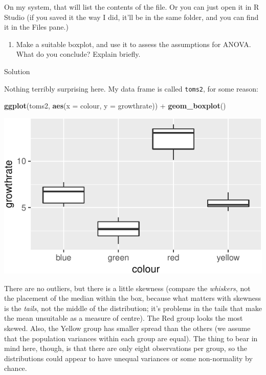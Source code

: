 \documentclass[]{tufte-book}
\newenvironment{Shaded}{}{}
\newcommand{\DataTypeTok}[1]{\textcolor[rgb]{0.56,0.13,0.00}{#1}}
\newcommand{\KeywordTok}[1]{\textcolor[rgb]{0.00,0.44,0.13}{\textbf{#1}}}
\newcommand{\NormalTok}[1]{#1}
\newcommand{\OperatorTok}[1]{\textcolor[rgb]{0.40,0.40,0.40}{#1}}
\newcommand{\StringTok}[1]{\textcolor[rgb]{0.25,0.44,0.63}{#1}}
\providecommand{\tightlist}{%
  \setlength{\itemsep}{0pt}\setlength{\parskip}{0pt}}
\theoremstyle{definition}
\theoremstyle{definition}
\theoremstyle{definition}
\theoremstyle{remark}
\begin{document}
On my system, that will list the contents of the file. Or you can just
open it in R Studio (if you saved it the way I did, it'll be in the same
folder, and you can find it in the Files pane.)

\begin{enumerate}
\def\labelenumi{(\alph{enumi})}
\setcounter{enumi}{3}
\tightlist
\item
  Make a suitable boxplot, and use it to assess the assumptions for
  ANOVA. What do you conclude? Explain briefly.
\end{enumerate}

Solution

Nothing terribly surprising here. My data frame is called
\texttt{toms2}, for some reason:

\begin{Shaded}
\begin{Highlighting}[]
\KeywordTok{ggplot}\NormalTok{(toms2, }\KeywordTok{aes}\NormalTok{(}\DataTypeTok{x =}\NormalTok{ colour, }\DataTypeTok{y =}\NormalTok{ growthrate)) }\OperatorTok{+}\StringTok{ }
\StringTok{    }\KeywordTok{geom_boxplot}\NormalTok{()}
\end{Highlighting}
\end{Shaded}

\includegraphics{11-tidying-and-selecting-data_files/figure-latex/unnamed-chunk-32-1}

There are no outliers, but there is a little skewness (compare the
\emph{whiskers}, not the placement of the median within the box, because
what matters with skewness is the \emph{tails}, not the middle of the
distribution; it's problems in the tails that make the mean unsuitable
as a measure of centre). The Red group looks the most skewed. Also, the
Yellow group has smaller spread than the others (we assume that the
population variances within each group are equal). The thing to bear in
mind here, though, is that there are only eight observations per group,
so the distributions could appear to have unequal variances or some
non-normality by chance.
\end{document}
